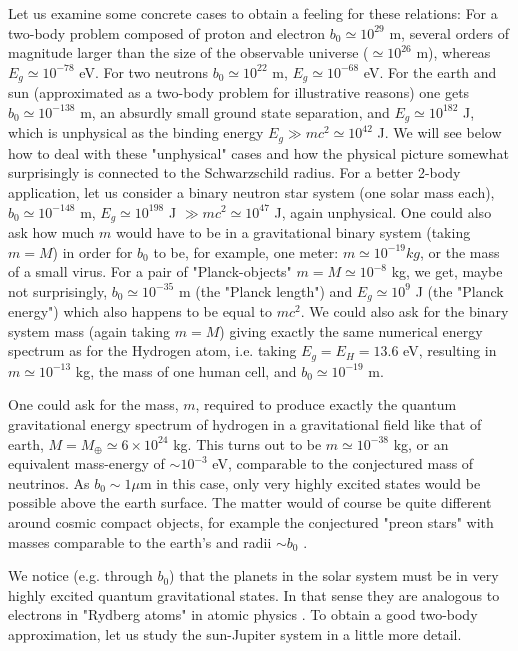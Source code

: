 	Let us examine some concrete cases to obtain a feeling for these
	relations: For a two-body problem composed of proton and electron
	$b_0 \simeq 10^{29}$ m, several orders of magnitude larger than
	the size of the observable universe ($\simeq 10^{26}$ m), whereas
	$E_g \simeq 10^{-78}$ eV. For two neutrons $b_0 \simeq 10^{22}$ m,
	$E_g \simeq 10^{-68}$ eV. For the earth and sun (approximated as a
	two-body problem for illustrative reasons) one gets $b_0 \simeq
	10^{-138}$ m, an absurdly small ground state separation, and $E_g
	\simeq 10^{182}$ J, which is unphysical as the binding energy $E_g
	\gg mc^2 \simeq 10^{42}$ J. We will see below how to deal with
	these "unphysical" cases and how the physical picture somewhat
	surprisingly is connected to the Schwarzschild radius. For a
	better 2-body application, let us consider a binary neutron star
	system (one solar mass each), $b_0 \simeq 10^{-148}$ m, $E_g
	\simeq 10^{198}$ J $\gg mc^2 \simeq 10^{47}$ J, again unphysical.
	One could also ask how much $m$ would have to be in a
	gravitational binary system (taking $m = M$) in order for $b_0$ to
	be, for example, one meter: $m \simeq 10^{-19} kg$, or the mass of
	a small virus. For a pair of "Planck-objects" $m = M \simeq
	10^{-8}$ kg, we get, maybe not surprisingly, $b_0 \simeq 10^{-35}$
	m (the "Planck length") and $E_g \simeq 10^{9}$ J (the "Planck
	energy") which also happens to be equal to $mc^2$. We could also
	ask for the binary system mass (again taking $m=M$) giving exactly
	the same numerical energy spectrum as for the Hydrogen atom, i.e.
	taking $E_g = E_H = 13.6$ eV, resulting in $m \simeq 10^{-13}$ kg,
	the mass of one human cell, and $b_0 \simeq 10^{-19}$ m.
	
	One could ask for the mass, $m$, required to produce exactly the
	quantum gravitational energy spectrum of hydrogen in a
	gravitational field like that of earth, $M = M_{\oplus} \simeq 6
	\times 10^{24}$ kg. This turns out to be $m \simeq 10^{-38}$ kg,
	or an equivalent mass-energy of $\sim 10^{-3}$ eV, comparable to
	the conjectured mass of neutrinos. As $b_0 \sim 1 \mu$m in this
	case, only very highly excited states would be possible above the
	earth surface. The matter would of course be quite different
	around cosmic compact objects, for example the conjectured "preon
	stars" with masses comparable to the earth's and radii $\sim b_0$
	\cite{HanssonSandin}.
	
	We notice (e.g. through $b_0$) that the planets in the solar
	system must be in very highly excited quantum gravitational
	states. In that sense they are analogous to electrons in "Rydberg
	atoms" in atomic physics \cite{Rydberg}. To obtain a good two-body
	approximation, let us study the sun-Jupiter system in a little
	more detail.
	
